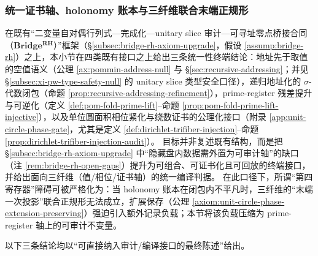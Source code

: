 \subsubsection{统一证书轴、holonomy 账本与三纤维联合末端正规形}\label{subsec:bridge-rh-unified-terminal-conclusions}
在既有“二变量自对偶行列式—完成化—unitary slice 审计—可寻址零点桥接合同（\(\mathbf{Bridge^{RH}}\)）”框架（\S\ref{subsec:bridge-rh-axiom-upgrade}，假设 \ref{assump:bridge-rh}）之上，本小节在四类既有接口之上给出三条统一性终端结论：地址先于取值的空值语义（公理 \ref{ax:pommin-address-null} 与 \S\ref{sec:recursive-addressing}；并见 \S\ref{subsec:xi-pw-type-safety-null} 的 unitary slice 类型安全口径），递归地址化的 \(\sigma\)-代数闭包（命题 \ref{prop:recursive-addressing-refinement}），prime-register 残差提升与可逆化（定义 \ref{def:pom-fold-prime-lift}--命题 \ref{prop:pom-fold-prime-lift-injective}），以及单位圆面积相位紧化与绕数证书的公理化接口（附录 \ref{app:unit-circle-phase-gate}，尤其是定义 \ref{def:dirichlet-trifiber-injection}--命题 \ref{prop:dirichlet-trifiber-injection-audit}）。
目标并非复述既有结构，而是把 \S\ref{subsec:bridge-rh-axiom-upgrade} 中“隐藏盘内数据需外置为可审计轴”的缺口（注 \ref{rem:bridge-rh-open-gaps}）提升为可组合、可证书化且可回放的终端接口，并给出面向三纤维（值/相位/证书轴）的统一编译判据。
在此口径下，所谓“第四寄存器”障碍可被严格化为：当 holonomy 账本在闭包内不平凡时，三纤维的“末端一次投影”联合正规形无法成立，扩展保存（公理 \ref{axiom:unit-circle-phase-extension-preserving}）强迫引入额外记录负载；本节将该负载压缩为 prime-register 轴上的可审计不变量。
\par
以下三条结论均以“可直接纳入审计/编译接口的最终陈述”给出。


